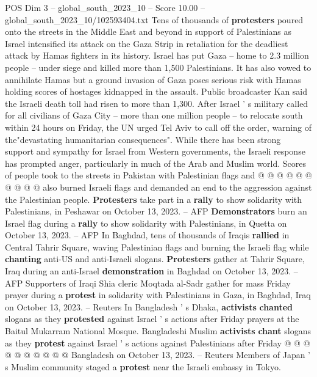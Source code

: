\begin{textsample}{POS Dim 3 – global\_south\_2023\_10 – Score 10.00 – global\_south\_2023\_10/102593404.txt}  \label{ex:f3_pos_431}
Tens of thousands of \textbf{protesters} poured onto the streets in the Middle East and beyond in support of Palestinians as Israel intensified its attack on the Gaza Strip in retaliation for the deadliest attack by Hamas fighters in its history.
Israel has put Gaza -- home to 2.3 million people -- under siege and killed more than 1,500 Palestinians.
It has also vowed to annihilate Hamas but a ground invasion of Gaza poses serious risk with Hamas holding scores of hostages kidnapped in the assault.
Public broadcaster Kan said the Israeli death toll had risen to more than 1,300.
After Israel ' s military called for all civilians of Gaza City -- more than one million people -- to relocate south within 24 hours on Friday, the UN urged Tel Aviv to call off the order, warning of the"devastating humanitarian consequences".
While there has been strong support and sympathy for Israel from Western governments, the Israeli response has prompted anger, particularly in much of the Arab and Muslim world.
Scores of people took to the streets in Pakistan with Palestinian flags and @ @ @ @ @ @ @ @ @ @ also burned Israeli flags and demanded an end to the aggression against the Palestinian people. \textbf{Protesters} take part in a \textbf{rally} to show solidarity with Palestinians, in Peshawar on October 13, 2023. -- AFP \textbf{Demonstrators} burn an Israel flag during a \textbf{rally} to show solidarity with Palestinians, in Quetta on October 13, 2023. -- AFP In Baghdad, tens of thousands of Iraqis \textbf{rallied} in Central Tahrir Square, waving Palestinian flags and burning the Israeli flag while \textbf{chanting} anti-US and anti-Israeli slogans. \textbf{Protesters} gather at Tahrir Square, Iraq during an anti-Israel \textbf{demonstration} in Baghdad on October 13, 2023. -- AFP Supporters of Iraqi Shia cleric Moqtada al-Sadr gather for mass Friday prayer during a \textbf{protest} in solidarity with Palestinians in Gaza, in Baghdad, Iraq on October 13, 2023. -- Reuters In Bangladesh ' s Dhaka, \textbf{activists} \textbf{chanted} slogans as they \textbf{protested} against Israel ' s actions after Friday prayers at the Baitul Mukarram National Mosque.
Bangladeshi Muslim \textbf{activists} \textbf{chant} slogans as they \textbf{protest} against Israel ' s actions against Palestinians after Friday @ @ @ @ @ @ @ @ @ @ Bangladesh on October 13, 2023. -- Reuters Members of Japan ' s Muslim community staged a \textbf{protest} near the Israeli embassy in Tokyo.

\end{textsample}
